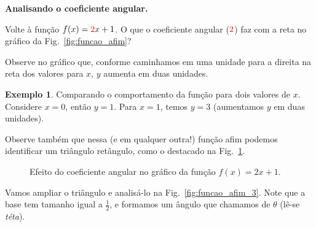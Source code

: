 \documentclass[12pt,openright,twoside,a4paper]{article}
\theoremstyle{definition}
\newtheorem{example}{Exemplo}[section]
\begin{document}
	\textbf{Analisando o coeficiente angular.}\label{tema:coef_angular}
	
	Volte à função $f(x) = \textcolor{red}{2}x + 1$. O que o coeficiente angular ($\textcolor{red}{2}$) faz com a reta no gráfico da Fig.~\ref{fig:funcao_afim}?
	
	Observe no gráfico que, conforme caminhamos em uma unidade para a direita na reta dos valores para $x$, $y$ aumenta em duas unidades.
	
	\begin{example}\label{ex:funcao_afim_2}Comparando o comportamento da função para dois valores de $x$. Considere $x = 0$, então $y = 1$. Para $x=1$, temos $y=3$ (aumentamos $y$ em duas unidades).
	\end{example}
	
	Observe também que nessa (e em qualquer outra!) função afim podemos identificar um triângulo retângulo, como o destacado na Fig.~\ref{fig:funcao_afim_2}.
	
	\begin{figure}[h]
		\centering
		\caption{Efeito do coeficiente angular no gráfico da função $f(x) = 2x + 1$.}
		\label{fig:funcao_afim_2}
	\end{figure}
	
	Vamos ampliar o triângulo e analisá-lo na Fig.~\ref{fig:funcao_afim_3}. Note que a base tem tamanho igual a $\displaystyle \frac{1}{2}$, e formamos um ângulo que chamamos de $\theta$ (lê-se \textit{téta}).
	
\end{document}
